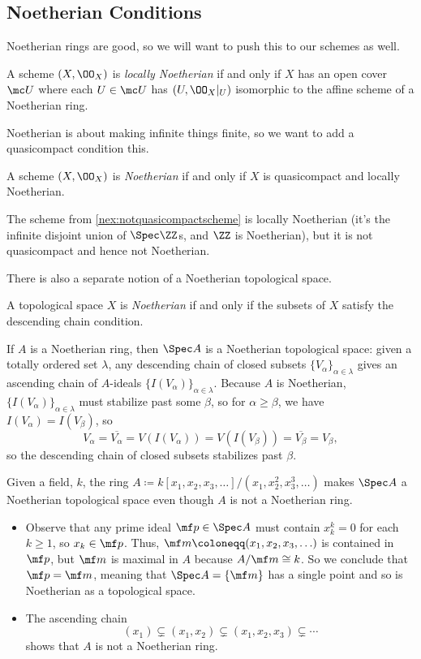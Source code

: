 \documentclass[../notes.tex]{subfiles}
\begin{document}
\subsection{Noetherian Conditions}
Noetherian rings are good, so we will want to push this to our schemes as well.
\begin{definition}
	A scheme $(X,\OO_X)$ is \textit{locally Noetherian} if and only if $X$ has an open cover $\mc U$ where each $U\in\mc U$ has $(U,\OO_X|_U)$ isomorphic to the affine scheme of a Noetherian ring.
\end{definition}
Noetherian is about making infinite things finite, so we want to add a quasicompact condition this.
\begin{definition}[Noetherian]
	A scheme $(X,\OO_X)$ is \textit{Noetherian} if and only if $X$ is quasicompact and locally Noetherian.
\end{definition}
\begin{example}
	The scheme from \autoref{nex:notquasicompactscheme} is locally Noetherian (it's the infinite disjoint union of $\Spec\ZZ$s, and $\ZZ$ is Noetherian), but it is not quasicompact and hence not Noetherian.
\end{example}
There is also a separate notion of a Noetherian topological space.
\begin{definition}[Noetherian]
	A topological space $X$ is \textit{Noetherian} if and only if the subsets of $X$ satisfy the descending chain condition.
\end{definition}
\begin{example} \label{ex:noetherianringisnoetherian}
	If $A$ is a Noetherian ring, then $\Spec A$ is a Noetherian topological space: given a totally ordered set $\lambda$, any descending chain of closed subsets $\{V_\alpha\}_{\alpha\in\lambda}$ gives an ascending chain of $A$-ideals $\{I(V_\alpha)\}_{\alpha\in\lambda}$. Because $A$ is Noetherian, $\{I(V_\alpha)\}_{\alpha\in\lambda}$ must stabilize past some $\beta$, so for $\alpha\ge\beta$, we have $I(V_\alpha)=I(V_\beta)$, so
	\[V_\alpha=\overline{V_\alpha}=V(I(V_\alpha))=V(I(V_\beta))=\overline{V_\beta}=V_\beta,\]
	so the descending chain of closed subsets stabilizes past $\beta$.
\end{example}
\begin{nex}
	Given a field, $k$, the ring $A\coloneqq k[x_1,x_2,x_3,\ldots]/\left(x_1,x_2^2,x_3^3,\ldots\right)$ makes $\Spec A$ a Noetherian topological space even though $A$ is not a Noetherian ring.
	\begin{itemize}
		\item Observe that any prime ideal $\mf p\in\Spec A$ must contain $x_k^k=0$ for each $k\ge1$, so $x_k\in\mf p$. Thus, $\mf m\coloneqq(x_1,x_2,x_3,\ldots)$ is contained in $\mf p$, but $\mf m$ is maximal in $A$ because $A/\mf m\cong k$. So we conclude that $\mf p=\mf m$, meaning that $\Spec A=\{\mf m\}$ has a single point and so is Noetherian as a topological space.
		\item The ascending chain
		\[(x_1)\subsetneq(x_1,x_2)\subsetneq(x_1,x_2,x_3)\subsetneq\cdots\]
		shows that $A$ is not a Noetherian ring.
	\end{itemize}
\end{nex}
\end{document}
